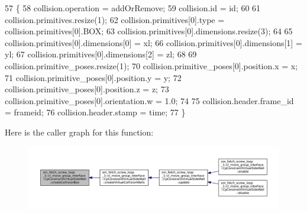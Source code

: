 \begin{DoxyCode}
57         \{
58             collision.operation = addOrRemove;
59             collision.id = id;
60 
61             collision.primitives.resize(1);
62             collision.primitives[0].type = collision.primitives[0].BOX;
63             collision.primitives[0].dimensions.resize(3);
64 
65             collision.primitives[0].dimensions[0] = xl;
66             collision.primitives[0].dimensions[1] = yl;
67             collision.primitives[0].dimensions[2] = zl;
68 
69             collision.primitive\_poses.resize(1);
70             collision.primitive\_poses[0].position.x = x;
71             collision.primitive\_poses[0].position.y = y;
72             collision.primitive\_poses[0].position.z = z;
73             collision.primitive\_poses[0].orientation.w = 1.0;
74 
75             collision.header.frame\_id = frameid;
76             collision.header.stamp = time;
77         \}
\end{DoxyCode}
Here is the caller graph for this function\+:
\nopagebreak
\begin{figure}[H]
\begin{center}
\leavevmode
\includegraphics[width=350pt]{classsm__fetch__screw__loop__1_1_1cl__move__group__interface_1_1CpConstraintVirtualSideWall_a57a9d6a1149ded198943c69fedc567fc_icgraph}
\end{center}
\end{figure}
\mbox{\label{classsm__fetch__screw__loop__1_1_1cl__move__group__interface_1_1CpConstraintVirtualSideWall_acbe325c0c6fb25e10efddb9be7e672d1}} 
